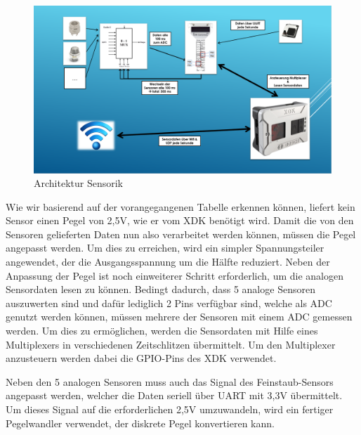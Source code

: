 \begin{figure}[H]	
	\includegraphics[width=\textwidth]{images/Architektur_fein.png}	
	\caption{Architektur Sensorik}
	\label{fig:Architektur_fein}
\end{figure}

Wie wir basierend auf der vorangegangenen Tabelle erkennen können, liefert kein Sensor einen Pegel von 2,5V, wie er vom \acs{XDK} benötigt wird. Damit die von den Sensoren gelieferten Daten nun also verarbeitet werden können, müssen die Pegel angepasst werden. Um dies zu erreichen, wird ein simpler Spannungsteiler angewendet, der die Ausgangsspannung um die Hälfte reduziert.
Neben der Anpassung der Pegel ist noch einweiterer Schritt erforderlich, um die analogen Sensordaten lesen zu können. Bedingt dadurch, dass 5 analoge Sensoren auszuwerten sind und dafür lediglich 2 Pins verfügbar sind, welche als \acs{ADC} genutzt werden können, müssen mehrere der Sensoren mit einem \acs{ADC} gemessen werden. Um dies zu ermöglichen, werden die Sensordaten mit Hilfe eines Multiplexers in verschiedenen Zeitschlitzen übermittelt. Um den Multiplexer anzusteuern werden dabei die \acs{GPIO}-Pins des \acs{XDK} verwendet.

Neben den 5 analogen Sensoren muss auch das Signal des Feinstaub-Sensors angepasst werden, welcher die Daten seriell über \acs{UART} mit 3,3V übermittelt. Um dieses Signal auf die erforderlichen 2,5V umzuwandeln, wird ein fertiger Pegelwandler verwendet, der diskrete Pegel konvertieren kann.


